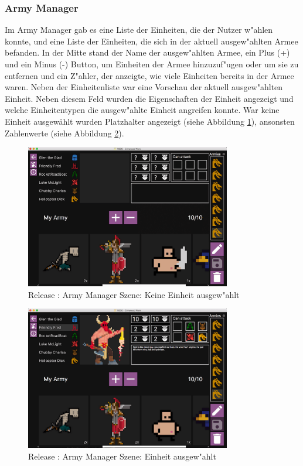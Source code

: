 \documentclass[12pt, titlepage]{scrartcl}
\newcommand{\RN}[1]{%
	\textup{\uppercase\expandafter{\romannumeral#1}}%
}
\begin{document}
		    \subsubsection{Army Manager}
		        Im Army Manager gab es eine Liste der Einheiten, die der Nutzer w"ahlen konnte, und eine Liste der Einheiten, die sich in der aktuell ausgew"ahlten Armee befanden. In der Mitte stand der Name der ausgew"ahlten Armee, ein Plus (+) und ein Minus (-) Button, um Einheiten der Armee hinzuzuf"ugen oder um sie zu entfernen und ein Z"ahler, der anzeigte, wie viele Einheiten bereits in der Armee waren. Neben der Einheitenliste war eine Vorschau der aktuell ausgew"ahlten Einheit. Neben diesem Feld wurden die Eigenschaften der Einheit angezeigt und welche Einheitentypen die ausgew"ahlte Einheit angreifen konnte. War keine Einheit ausgew\"ahlt wurden Platzhalter angezeigt (siehe Abbildung \ref{Army_Manager_No_Unit_Selected}), ansonsten Zahlenwerte (siehe Abbildung \ref{Army_Manager_Unit_Selected}). \\
		        \begin{figure}[H] 
    				\centering
    				\includegraphics[width=0.8\textwidth]{images/old_state/army_manager/NoUnitSelected.png}
    				\caption{Release \RN{2}: Army Manager Szene: Keine Einheit ausgew"ahlt}
    				\label{Army_Manager_No_Unit_Selected}
			    \end{figure}
			    \begin{figure}[H] 
    				\centering
    				\includegraphics[width=0.8\textwidth]{images/old_state/army_manager/UnitSelected.png}
    				\caption{Release \RN{2}: Army Manager Szene: Einheit ausgew"ahlt}
    				\label{Army_Manager_Unit_Selected}
			    \end{figure}
\end{document}
